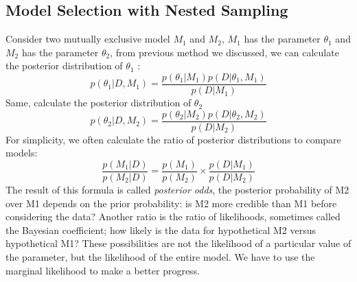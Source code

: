 \documentclass[11pt]{book}
\begin{document}
\subsection{Model Selection with Nested Sampling}
Consider two mutually exclusive model $M_1$ and $M_2$, $M_1$ has the parameter $\theta_1$ and $M_2$ has the 
parameter $\theta_2$, from previous method we discussed, we can calculate the posterior distribution of $\theta_1$ :
\begin{equation}
	p(\theta_1|D, M_1) = \frac{p(\theta_1|M_1)p(D|\theta_1, M_1)}{p(D|M_1)}
\end{equation}
Same, calculate the posterior distribution of $\theta_2$ 
\begin{equation}
	p(\theta_2|D, M_2) = \frac{p(\theta_2|M_2)p(D|\theta_2, M_2)}{p(D|M_2)}
\end{equation}
For simplicity, we often calculate the ratio of posterior distributions to compare models:
\begin{equation}
	\frac{p(M_1|D)}{p(M_2|D)} = \frac{p(M_1)}{p(M_2)} \times \frac{p(D|M_1)}{p(D|M_2)}
\end{equation}
The result of this formula is called \textit{posterior odds}, the posterior probability of M2 over M1 depends on the prior probability: is M2 more credible than M1 before considering the data? Another ratio is the ratio of likelihoods, sometimes called the Bayesian coefficient; how likely is the data for hypothetical M2 versus hypothetical M1? These possibilities are not the likelihood of a particular value of the parameter, but the likelihood of the entire model.
We have to use the marginal likelihood to make a better progress.
\end{document}
